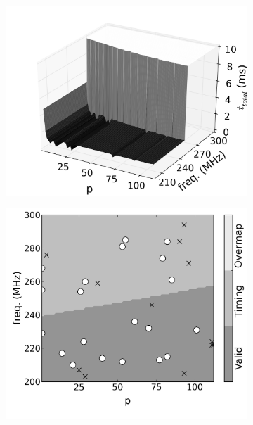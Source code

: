 \documentclass[runningheads,a4paper]{llncs}
\begin{document}
\begin{figure}
\begin{subfigure}{0.31\textwidth}
                \centering
                \includegraphics[width=\textwidth]{./figs/surmodel011_22.png}
        \end{subfigure}
                \begin{subfigure}{0.31\textwidth}
                \centering
                \includegraphics[width=\textwidth]{./figs/svm000_13.png}
        \end{subfigure}
        \begin{subfigure}{0.31\textwidth}
                \centering

\end{subfigure}
\end{figure}
\end{document}
